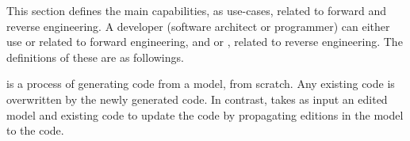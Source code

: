 


This section defines the main capabilities, as use-cases, related to forward and reverse engineering. 
A developer (software architect or programmer) can either use  or  related to forward engineering, and  or , related to reverse engineering. The definitions of these are as followings.

\begin{definition} \cite{Giese2006} is a process of generating code
	from a model, from scratch.
	Any existing code is overwritten by the newly generated code.
	In contrast,  takes as input an edited model and existing code to update the code by propagating
	editions in the model to the code.
\end{definition}

